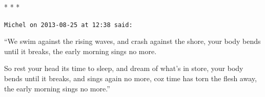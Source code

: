 
\begin{center}* * *\end{center}

\begin{footnotesize}
\begin{sffamily}
\texttt{Michel on 2013-08-25 at 12:38 said:}

``We swim against the rising waves, and crash against the shore, your body bends until it breaks, the early morning sings no more.

So rest your head its time to sleep, and dream of what's in store, your body bends until it breaks, and sings again no more, coz time has torn the flesh away, the early morning sings no more.''


\hfill

\end{sffamily}
\end{footnotesize}

